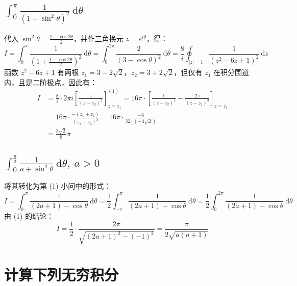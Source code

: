 \documentclass[UTF8]{report}
\theoremstyle{MyLineTheoremStyle} %
\theoremstyle{MyBlockTheoremStyle} %
\theoremstyle{MySubsubsectionStyle} %
\begin{document}
\subsection{$\displaystyle \int_{0}^{\pi}\frac{1}{\left(1 + \sin^2 \theta \right)^2} \ \mathrm{d}\theta$}
代入 $\sin^2 \theta = \frac{1 - \cos 2\theta}{2}$，并作三角换元 $z = e^{i\theta}$，得：
\begin{equation}
I = \int_{0}^{\pi} \frac{1}{\left(1 + \frac{1 - \cos 2\theta}{2}\right)^2} \ \mathrm{d} \theta = \int_{0}^{2\pi} \frac{2}{\left(3 - \cos \theta\right)^2} \ \mathrm{d}\theta
= \frac{8}{i} \oint_{|z| = 1} \frac{1}{\left(z^2 - 6z + 1\right)^2} \ \mathrm{d}z
\end{equation}
函数 $z^2 - 6z + 1$ 有两根 $z_1 = 3 - 2 \sqrt{2}$，$z_2 =  3 + 2 \sqrt{2}$，但仅有 $z_1$ 在积分围道内，且是二阶极点，因此有：
\begin{align}
    I &= \frac{8}{i}\cdot 2\pi i \left[\frac{z}{(z - z_2)^2}\right]^{(1)}_{z = z_1}
    = 16 \pi \cdot \left[\frac{1}{(z - z_2)^2} - \frac{2z}{(z - z_2)^3}\right]_{z = z_1}\\
    &= 16\pi \cdot \frac{-(z_1 + z_2)}{(z_1 - z_2)^3}
    = 16\pi \cdot \frac{-6}{32\cdot (-4\sqrt{2})}\\
    & \boxed{= \frac{3\sqrt{2}}{8}\pi}
\end{align}

\subsection{$\displaystyle \int_{0}^{\frac{\pi}{2}} \frac{1}{a + \sin^2 \theta} \ \mathrm{d}\theta, \ a >0$}
将其转化为第 (1) 小问中的形式：
\begin{equation}
I = \int_{0}^{\pi} \frac{1}{(2a+1) - \cos \theta} \ \mathrm{d}\theta
= \frac{1}{2}\int_{-\pi}^{\pi} \frac{1}{(2a+1) - \cos \theta} \ \mathrm{d}\theta
= \frac{1}{2}\int_{0}^{2\pi} \frac{1}{(2a+1) - \cos \theta} \ \mathrm{d}\theta
\end{equation}
由 (1) 的结论：
\begin{equation}
\boxed{
    I = \frac{1}{2}\cdot \frac{2\pi}{\sqrt{(2a+1)^2 - (-1)^2}} = \frac{\pi}{2\sqrt{a(a+1)}}
}
\end{equation}

\section{计算下列无穷积分}
\end{document}
